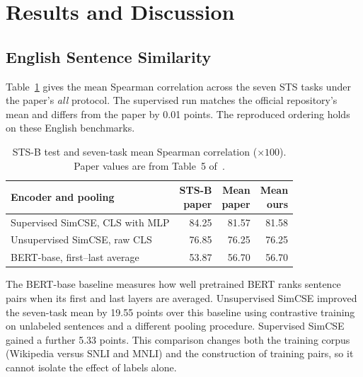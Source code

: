 \section{Results and Discussion}
\label{sec:results}
\subsection{English Sentence Similarity}
Table~\ref{tab:sts-reproduction} gives the mean Spearman correlation
across the seven STS tasks under the paper's \emph{all} protocol. The supervised
run matches the official repository's mean and differs from the paper by
0.01 points. The reproduced ordering holds on these English benchmarks.

\begin{table}[htbp]
\caption{STS-B test and seven-task mean Spearman correlation ($\times 100$).
Paper values are from Table~5 of~\cite{gao-etal-2021-simcse}.}
\label{tab:sts-reproduction}
\centering
\footnotesize
\begin{tabular}{@{}p{}rrr@{}}
\hline
Encoder and pooling & \shortstack[r]{STS-B\\paper} & \shortstack[r]{Mean\\paper} & \shortstack[r]{Mean\\ours} \\
\hline
Supervised SimCSE, CLS with MLP & 84.25 & 81.57 & 81.58 \\ %
Unsupervised SimCSE, raw CLS & 76.85 & 76.25 & 76.25 \\ %
BERT-base, first--last average & 53.87 & 56.70 & 56.70 \\ %
\hline
\end{tabular}
\end{table}

The BERT-base baseline measures how well pretrained
BERT ranks sentence pairs when its first and last layers are averaged.
Unsupervised SimCSE improved the seven-task mean by 19.55 points over
this baseline using contrastive training on unlabeled sentences and a
different pooling procedure. Supervised SimCSE gained a further 5.33
points. This comparison changes both the training corpus (Wikipedia
versus SNLI and MNLI) and the construction of training pairs, so it
cannot isolate the effect of labels alone.

